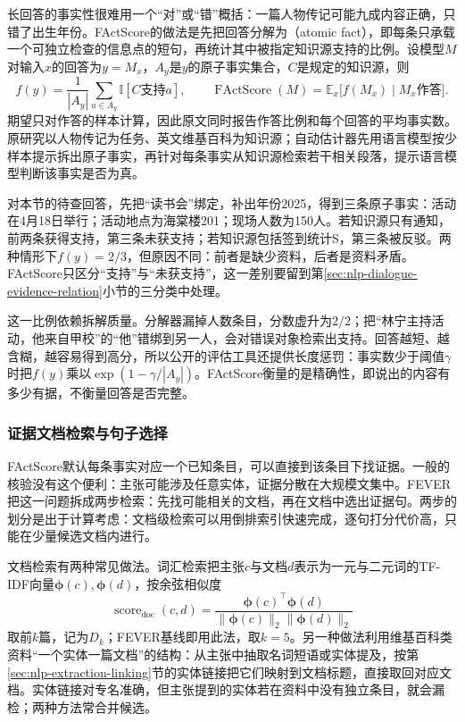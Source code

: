 长回答的事实性很难用一个“对”或“错”概括：一篇人物传记可能九成内容正确，只错了出生年份。FActScore的做法是先把回答分解为（atomic fact），即每条只承载一个可独立检查的信息点的短句，再统计其中被指定知识源支持的比例。设模型$M$对输入$x$的回答为$y=M_x$，$A_y$是$y$的原子事实集合，$C$是规定的知识源，则
\begin{equation}
 f(y)=\frac{1}{|A_y|}\sum_{a\in A_y}\mathbb{I}[C\text{支持}a],\qquad
 \operatorname{FActScore}(M)=\mathbb{E}_{x}\bigl[f(M_x)\mid M_x\text{作答}\bigr].
 \label{eq:nlp-dialogue-factscore}
\end{equation}
期望只对作答的样本计算，因此原文同时报告作答比例和每个回答的平均事实数。原研究以人物传记为任务、英文维基百科为知识源；自动估计器先用语言模型按少样本提示拆出原子事实，再针对每条事实从知识源检索若干相关段落，提示语言模型判断该事实是否为真。

对本节的待查回答，先把“读书会”绑定，补出年份2025，得到三条原子事实：活动在4月18日举行；活动地点为海棠楼201；现场人数为150人。若知识源只有通知，前两条获得支持，第三条未获支持；若知识源包括签到统计S，第三条被反驳。两种情形下$f(y)=2/3$，但原因不同：前者是缺少资料，后者是资料矛盾。FActScore只区分“支持”与“未获支持”，这一差别要留到第\ref{sec:nlp-dialogue-evidence-relation}小节的三分类中处理。

这一比例依赖拆解质量。分解器漏掉人数条目，分数虚升为$2/2$；把“林宁主持活动，他来自甲校”的“他”错绑到另一人，会对错误对象检索出支持。回答越短、越含糊，越容易得到高分，所以公开的评估工具还提供长度惩罚：事实数少于阈值$\gamma$时把$f(y)$乘以$\exp(1-\gamma/|A_y|)$。FActScore衡量的是精确性，即说出的内容有多少有据，不衡量回答是否完整。

\subsubsection{证据文档检索与句子选择}
\label{sec:nlp-dialogue-evidence-selection}

FActScore默认每条事实对应一个已知条目，可以直接到该条目下找证据。一般的核验没有这个便利：主张可能涉及任意实体，证据分散在大规模文集中。FEVER把这一问题拆成两步检索：先找可能相关的文档，再在文档中选出证据句。两步的划分是出于计算考虑：文档级检索可以用倒排索引快速完成，逐句打分代价高，只能在少量候选文档内进行。

文档检索有两种常见做法。词汇检索把主张$c$与文档$d$表示为一元与二元词的TF-IDF向量$\bm{\phi}(c),\bm{\phi}(d)$，按余弦相似度
\begin{equation}
 \operatorname{score}_{\mathrm{doc}}(c,d)=
 \frac{\bm{\phi}(c)^\top\bm{\phi}(d)}{\lVert\bm{\phi}(c)\rVert_2\lVert\bm{\phi}(d)\rVert_2}
 \label{eq:nlp-dialogue-doc-retrieval}
\end{equation}
取前$k$篇，记为$D_k$；FEVER基线即用此法，取$k=5$。另一种做法利用维基百科类资料“一个实体一篇文档”的结构：从主张中抽取名词短语或实体提及，按第\ref{sec:nlp-extraction-linking}节的实体链接把它们映射到文档标题，直接取回对应文档。实体链接对专名准确，但主张提到的实体若在资料中没有独立条目，就会漏检；两种方法常合并候选。

